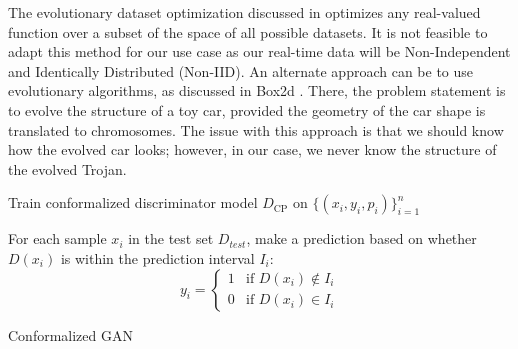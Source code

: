 \documentclass[9pt,conference]{IEEEtran}
\begin{document}
The evolutionary dataset optimization discussed in \cite{edo-paper} optimizes any real-valued function over a subset of the space of all possible datasets. It is not feasible to adapt this method for our use case as our real-time data will be Non-Independent and Identically Distributed (Non-IID). An alternate approach can be to use evolutionary algorithms, as discussed in Box2d \cite{catto2010box2d}. There, the problem statement is to evolve the structure of a toy car, provided the geometry of the car shape is translated to chromosomes. The issue with this approach is that we should know how the evolved car looks; however, in our case, we never know the structure of the evolved Trojan.

\begin{algorithm} [t]



Train conformalized discriminator model $D_\text{CP}$ on $\{(x_i, y_i, p_i)\}_{i=1}^n$\;

For each sample $x_i$ in the test set $D_{test}$, make a prediction based on whether $D(x_i)$ is within the prediction interval $I_i$:
\begin{equation*}
y_i =
\begin{cases}
1 & \text{if } D(x_i) \notin I_i \\
0 & \text{if } D(x_i) \in I_i
\end{cases}
\end{equation*}


\caption{Conformalized GAN}
\label{alg:cgan1}
\end{algorithm}
\end{document}
